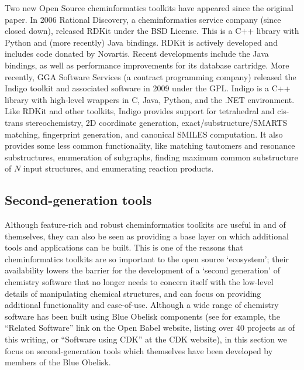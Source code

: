 \documentclass[10pt]{bmc_article}
\newenvironment{bmcformat}{\fussy\setboolean{publ}{true}}{\fussy}
\begin{document}
\begin{bmcformat}
Two new Open Source cheminformatics toolkits have appeared since the
original paper. In 2006 Rational Discovery, a cheminformatics service
company (since closed down), released RDKit \cite{WebRDKit} under the
BSD License. This is a C++ library with Python and (more recently)
Java bindings. RDKit is actively developed and includes
code donated by Novartis. Recent developments include the Java
bindings, as well as performance improvements for its database
cartridge. More recently, GGA Software Services
(a contract programming company)
released the Indigo toolkit \cite{WebIndigo} and associated software
in 2009 under the GPL. Indigo is a C++ library with
high-level wrappers in C, Java, Python, and the .NET
environment. Like RDKit and other toolkits, Indigo provides support for
tetrahedral and cis-trans stereochemistry, 2D coordinate generation,
exact/substructure/SMARTS matching, fingerprint generation, and
canonical SMILES computation.
It also provides some less common functionality, like matching
tautomers and resonance substructures, enumeration of subgraphs,
finding maximum common substructure of $N$ input structures, and
enumerating reaction products.

\subsection*{Second-generation tools}

Although feature-rich and robust cheminformatics toolkits are useful
in and of themselves, they can also be seen as providing a base layer
on which additional tools and applications can be built. This is one
of the reasons that cheminformatics toolkits are so important to the
open source `ecosystem'; their availability lowers the barrier for the
development of a `second generation' of chemistry software that no
longer needs to concern itself with the low-level details of
manipulating chemical structures, and can focus on providing
additional functionality and ease-of-use. Although a wide range of
chemistry software has been built using Blue Obelisk
components (see for example, the ``Related Software'' link on the Open
Babel website,\cite{WebOBRelated} listing over 40 projects as of this writing, 
or ``Software using CDK'' at the CDK website), in this
section we focus on second-generation tools which themselves have been
developed by members of the Blue Obelisk. 


\end{bmcformat}
\end{document}
